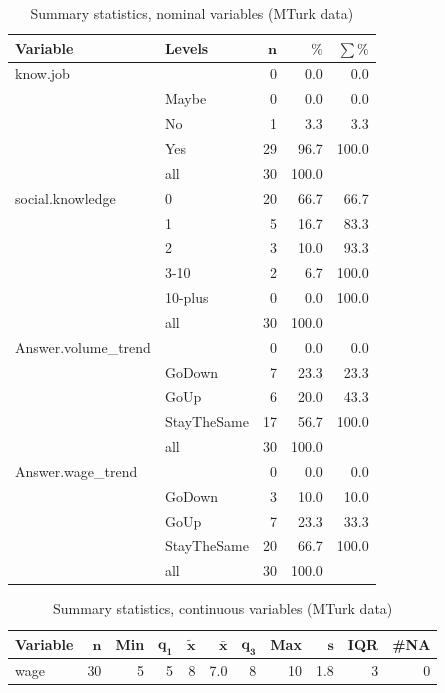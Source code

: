 \documentclass[a4paper,10pt]{article}\usepackage[]{graphicx}\usepackage[]{color}
\begin{document}
\begin{table}[ht]
\centering
{\footnotesize
\begin{tabular}{ll|rrr}
 \textbf{Variable} & \textbf{Levels} & $\mathbf{n}$ & $\mathbf{\%}$ & $\mathbf{\sum \%}$ \\ 
  \hline
know.job &  & 0 & 0.0 & 0.0 \\ 
   & Maybe & 0 & 0.0 & 0.0 \\ 
   & No & 1 & 3.3 & 3.3 \\ 
   & Yes & 29 & 96.7 & 100.0 \\ 
   \hline
 & all & 30 & 100.0 &  \\ 
   \hline
\hline
social.knowledge & 0 & 20 & 66.7 & 66.7 \\ 
   & 1 & 5 & 16.7 & 83.3 \\ 
   & 2 & 3 & 10.0 & 93.3 \\ 
   & 3-10 & 2 & 6.7 & 100.0 \\ 
   & 10-plus & 0 & 0.0 & 100.0 \\ 
   \hline
 & all & 30 & 100.0 &  \\ 
   \hline
\hline
Answer.volume\_trend &  & 0 & 0.0 & 0.0 \\ 
   & GoDown & 7 & 23.3 & 23.3 \\ 
   & GoUp & 6 & 20.0 & 43.3 \\ 
   & StayTheSame & 17 & 56.7 & 100.0 \\ 
   \hline
 & all & 30 & 100.0 &  \\ 
   \hline
\hline
Answer.wage\_trend &  & 0 & 0.0 & 0.0 \\ 
   & GoDown & 3 & 10.0 & 10.0 \\ 
   & GoUp & 7 & 23.3 & 33.3 \\ 
   & StayTheSame & 20 & 66.7 & 100.0 \\ 
   \hline
 & all & 30 & 100.0 &  \\ 
   \hline
\hline
\end{tabular}
}
\caption{Summary statistics, nominal variables (MTurk data)} 
\label{tab1:35-9020}
\end{table}
\begin{table}[ht]
\centering
{\footnotesize
\begin{tabular}{lrrrrrrrrrr}
 \textbf{Variable} & $\mathbf{n}$ & \textbf{Min} & $\mathbf{q_1}$ & $\mathbf{\widetilde{x}}$ & $\mathbf{\bar{x}}$ & $\mathbf{q_3}$ & \textbf{Max} & $\mathbf{s}$ & \textbf{IQR} & \textbf{\#NA} \\ 
  \hline
wage & 30 & 5 & 5 & 8 & 7.0 & 8 & 10 & 1.8 & 3 & 0 \\ 
  \end{tabular}
}
\caption{Summary statistics, continuous variables (MTurk data)} 
\label{tab2:35-9020}
\end{table}
\end{document}
